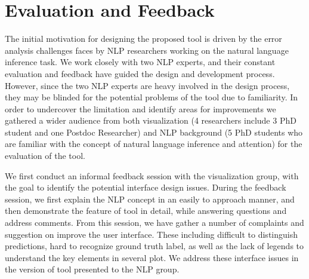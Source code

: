 \section{Evaluation and Feedback}

The initial motivation for designing the proposed tool is driven by the error analysis challenges faces by NLP researchers working on the natural language inference task. We work closely with two NLP experts, and their constant evaluation and feedback have guided the design and development process.
%
However, since the two NLP experts are heavy involved in the design process, they may be blinded for the potential problems of the tool due to familiarity.  In order to undercover the limitation and identify areas for improvements we gathered a wider audience from both visualization (4 researchers include 3 PhD student and one Postdoc Researcher) and NLP background (5 PhD students who are familiar with the concept of natural language inference and attention) for the evaluation of the tool.  
%

We first conduct an informal feedback session with the visualization group, with the goal to identify the potential interface design issues. During the feedback session, we first explain the NLP concept in an easily to approach manner, and then demonstrate the feature of tool in detail, while answering questions and address comments.
%
From this session, we have gather a number of complaints and suggestion on improve the user interface. These  including difficult to distinguish predictions, hard to recognize ground truth label, as well as the lack of legends to understand the key elements in several plot. We address these interface issues in the version of tool presented to the NLP group.

